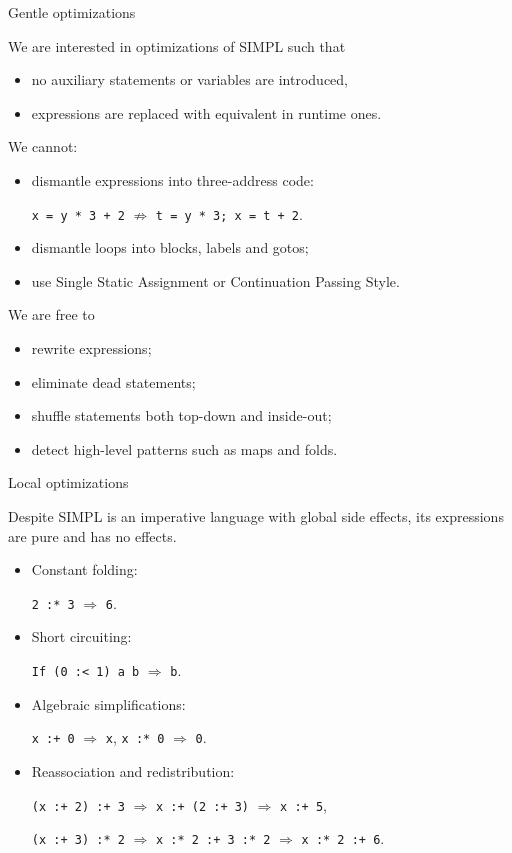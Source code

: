 \documentclass[handout]{beamer}
\begin{document}
\begin{frame}{Gentle optimizations}

We are interested in optimizations of SIMPL such that
\begin{itemize}
\item no auxiliary statements or variables are introduced,
\item expressions are replaced with equivalent in runtime ones.
\end{itemize}

We cannot:
\begin{itemize}
\item dismantle expressions into three-address code: \par
      {\tt x = y * 3 + 2} $\not\Longrightarrow$ {\tt t = y * 3; x = t + 2}.
\item dismantle loops into blocks, labels and gotos;
\item use Single Static Assignment or Continuation Passing Style.
\end{itemize}

We are free to
\begin{itemize}
\item rewrite expressions;
\item eliminate dead statements;
\item shuffle statements both top-down and inside-out;
\item detect high-level patterns such as maps and folds.
\end{itemize}

\end{frame}

\begin{frame}{Local optimizations}

Despite SIMPL is an imperative language with global side effects,
its expressions are pure and has no effects.

\begin{itemize}
\item Constant folding: \par
      {\tt 2 :* 3} $\Longrightarrow$ {\tt 6}.

\item Short circuiting: \par
      {\tt If (0 :< 1) a b} $\Longrightarrow$ {\tt b}.

\item Algebraic simplifications: \par
  {\tt x :+ 0} $\Longrightarrow$ {\tt x}, {\tt x :* 0} $\Longrightarrow$ {\tt 0}.

\item Reassociation and redistribution: \par
  {\tt (x :+ 2) :+ 3} $\Longrightarrow$ {\tt x :+ (2 :+ 3)} $\Longrightarrow$ {\tt x :+ 5}, \par
  {\tt (x :+ 3) :* 2} $\Longrightarrow$ {\tt x :* 2 :+ 3 :* 2} $\Longrightarrow$ {\tt x :* 2 :+ 6}.

\end{itemize}

\end{frame}
\end{document}
